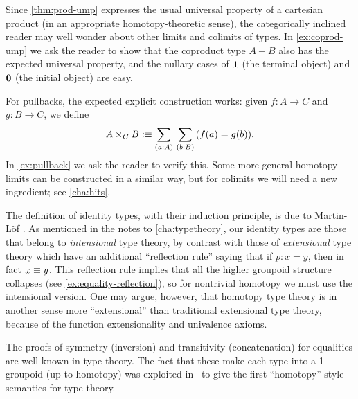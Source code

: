 %
%
%
%
Since \autoref{thm:prod-ump} expresses the usual universal property of a cartesian product (in an appropriate homotopy-theoretic sense), the categorically inclined reader may well wonder about other limits and colimits of types.
In \autoref{ex:coprod-ump} we ask the reader to show that the coproduct type $A+B$ also has the expected universal property, and the nullary cases of $\mathbf{1}$ (the terminal object) and $\mathbf{0}$ (the initial object) are easy.
%
%
%
%

%
For pullbacks, the expected explicit construction works: given $f:A\to C$ and $g:B\to C$, we define
\begin{equation}
  A\times_C B \defeq \sm{a:A}{b:B} (f(a)=g(b)).\label{eq:defn-pullback}
\end{equation}
In \autoref{ex:pullback} we ask the reader to verify this.
Some more general homotopy limits can be constructed in a similar way, but for colimits we will need a new ingredient; see \autoref{cha:hits}.

%

\sectionNotes

The definition of identity types, with their induction principle, is due to Martin-L\"of \cite{Martin-Lof-1972}.
%
%
%
%
%
As mentioned in the notes to \autoref{cha:typetheory}, our identity types are those that belong to \emph{intensional} type theory, by contrast with those of \emph{extensional} type theory which have an additional ``reflection rule'' saying that if $p:x=y$, then in fact $x\equiv y$.
This reflection rule implies that all the higher groupoid structure collapses (see \autoref{ex:equality-reflection}), so for nontrivial homotopy we must use the intensional version. 
One may argue, however, that homotopy type theory is in another sense more ``extensional'' than traditional extensional type theory, because of the function extensionality and univalence axioms.  

The proofs of symmetry (inversion) and transitivity (concatenation) for equalities are well-known in type theory.
The fact that these make each type into a 1-groupoid (up to homotopy) was exploited in~\cite{hs:gpd-typethy} to give the first ``homotopy'' style semantics for type theory.  

